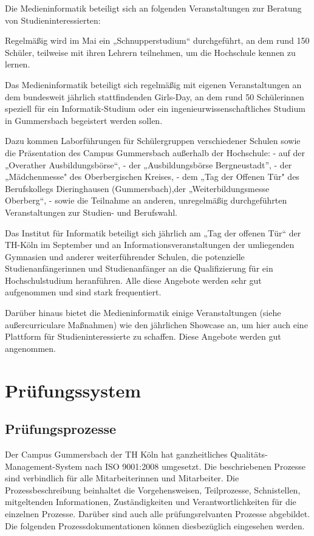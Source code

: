 Die Medieninformatik beteiligt sich an folgenden Veranstaltungen zur
Beratung von Studieninteressierten:

Regelmäßig wird im Mai ein „Schnupperstudium`` durchgeführt, an dem rund
150 Schüler, teilweise mit ihren Lehrern teilnehmen, um die Hochschule
kennen zu lernen.

Das Medieninformatik beteiligt sich regelmäßig mit eigenen
Veranstaltungen an dem bundesweit jährlich stattfindenden Girls-Day, an
dem rund 50 Schülerinnen speziell für ein Informatik-Studium oder ein
ingenieurwissenschaftliches Studium in Gummersbach begeistert werden
sollen.

Dazu kommen Laborführungen für Schülergruppen verschiedener Schulen
sowie die Präsentation des Campus Gummersbach außerhalb der Hochschule:
- auf der „Overather Ausbildungsbörse``, - der „Ausbildungsbörse
Bergneustadt'', - der „Mädchenmesse" des Oberbergischen Kreises, - dem
„Tag der Offenen Tür" des Berufskollegs Dieringhausen (Gummersbach),der
„Weiterbildungsmesse Oberberg``, - sowie die Teilnahme an anderen,
unregelmäßig durchgeführten Veranstaltungen zur Studien- und Berufswahl.

Das Institut für Informatik beteiligt sich jährlich am „Tag der offenen
Tür`` der TH-Köln im September und an Informationsveranstaltungen der
umliegenden Gymnasien und anderer weiterführender Schulen, die
potenzielle Studienanfängerinnen und Studienanfänger an die
Qualifizierung für ein Hochschulstudium heranführen. Alle diese Angebote
werden sehr gut aufgenommen und sind stark frequentiert.

Darüber hinaus bietet die Medieninformatik einige Veranstaltungen (siehe
außercurriculare Maßnahmen) wie den jährlichen Showcase an, um hier auch
eine Plattform für Studieninteressierte zu schaffen. Diese Angebote
werden gut angenommen.

\chapter{Prüfungssystem}\label{pruxfcfungssystem}

\section{Prüfungsprozesse}\label{pruxfcfungsprozesse}

Der Campus Gummersbach der TH Köln hat ganzheitliches
Qualitäts-Management-System nach ISO 9001:2008 umgesetzt. Die
beschriebenen Prozesse sind verbindlich für alle Mitarbeiterinnen und
Mitarbeiter. Die Prozessbeschreibung beinhaltet die Vorgehensweisen,
Teilprozesse, Schnistellen, mitgeltenden Informationen, Zuständigkeiten
und Verantwortlichkeiten für die einzelnen Prozesse. Darüber sind auch
alle prüfungsrelvanten Prozesse abgebildet. Die folgenden
Prozessdokumentationen können diesbezüglich eingesehen werden.

